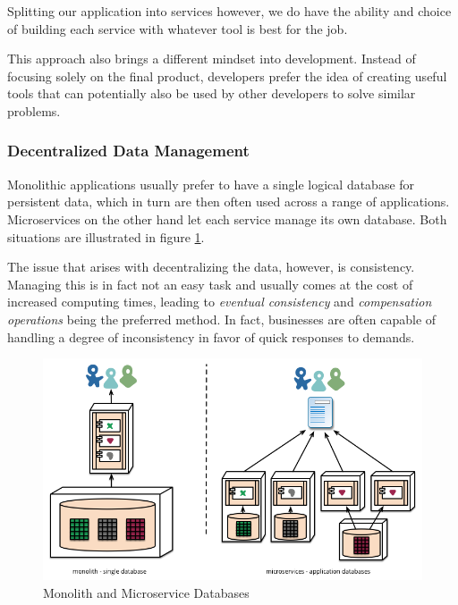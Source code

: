 Splitting our application into services however, we do have the
ability and choice of building each service with whatever tool is best
for the job.

This approach also brings a different mindset into development.
Instead of focusing solely on the final product,
developers prefer the idea of creating useful tools that can
potentially also be used by other developers to solve similar
problems. \cite{ms-definition}

\subsubsection{Decentralized Data Management} 
\label{sec:decentralized}

Monolithic applications usually prefer to have a single logical
database for persistent data, which in turn are then often used across
a range of applications. Microservices on the other hand let each
service manage its own database. Both situations are illustrated in 
figure \ref{fig:databases}. \cite{ms-definition}

The issue that arises with decentralizing the data, however, is
consistency.  Managing this is in fact not an easy task and usually
comes at the cost of increased computing times, leading to
\textit{eventual consistency} and \textit{compensation operations}
being the preferred method.  In fact, businesses are often capable of
handling a degree of inconsistency in favor of quick responses to
demands. \cite{ms-definition}

\begin{figure}
	\centering
	\includegraphics[width=\linewidth]{images/decentralised-data.png}
	\caption{Monolith and Microservice Databases \cite{ms-definition}}
	\label{fig:databases}
\end{figure}

